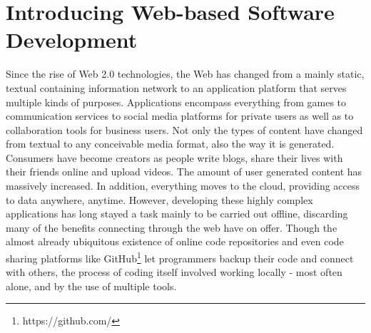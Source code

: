 \section{Introducing Web-based Software Development}
\label{sec:Introduction}

	
	
Since the rise of Web 2.0 technologies, the Web has changed from a mainly static, textual containing information network to an application platform that serves multiple kinds of purposes. Applications encompass everything from games to communication services to social media platforms for private users as well as to collaboration tools for business users. Not only the types of content have changed from textual to any conceivable media format, also the way it is generated. Consumers have become creators as people write blogs, share their lives with their friends online and upload videos. The amount of user generated content has massively increased. In addition, everything moves to the cloud, providing access to data anywhere, anytime. However, developing these highly complex applications has long stayed a task mainly to be carried out offline, discarding many of the benefits connecting through the web have on offer. Though the almost already ubiquitous existence of online code repositories and even code sharing platforms like GitHub\footnote{https://github.com/} let programmers backup their code and connect with others, the process of coding itself involved working locally - most often alone, and by the use of multiple tools.

